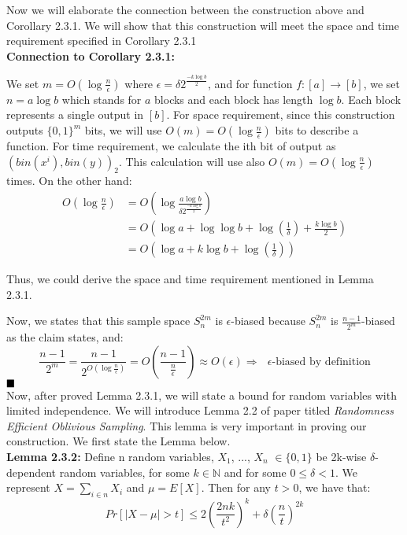 \documentclass[a4paper, english]{paper}
\begin{document}
 Now we will elaborate the connection between the construction above and Corollary 2.3.1. We will show that this construction will meet the space and time requirement specified in Corollary 2.3.1\\

\noindent\textbf{Connection to Corollary 2.3.1:}\par
We set $m=O(\log \frac n \epsilon)$ where $\epsilon = \delta 2^{\frac{-k\log b}2}$, and for function $f: [a]\rightarrow[b]$, we set $n=a\log b$ which stands for $a$ blocks and each block has length $\log b$. Each block represents a single output in $[b]$. For space requirement, since this construction outputs $\{0,1\}^m$ bits, we will use $O(m)=O(\log \frac n \epsilon)$ bits to describe a function. For time requirement, we calculate the ith bit of output as $(bin(x^i),bin(y))_2$. This calculation will use also $O(m)=O(\log \frac n \epsilon)$ times. On the other hand:
\begin{align*}
O(\log \frac n \epsilon) &= O(\log \frac{a\log b}{\delta 2^{\frac{-k\log b}2}})\\
&= O(\log a + \log\log b+\log(\frac1\delta)+\frac{k \log b}2)\\
&= O(\log a + k \log b+ \log(\frac1\delta))
\end{align*}\par
Thus, we could derive the space and time requirement mentioned in Lemma 2.3.1.\par
Now, we states that this sample space $S^{2m}_n$ is $\epsilon$-biased because $S^{2m}_n$ is $\frac{n-1}{2^m}$-biased as the claim states, and:
$$\frac{n-1}{2^m} = \frac{n-1}{2^{O(\log\frac n \epsilon)}} = O(\frac{n-1}{\frac n \epsilon}) \approx O(\epsilon)\Rightarrow \text{ $\epsilon$-biased by definition}$$
$\hfill\blacksquare$ \\

\vspace{0.5cm}
 Now, after proved Lemma 2.3.1, we will state a bound for random variables with limited independence. We will introduce Lemma 2.2 of paper titled \textit{Randomness Efficient Oblivious Sampling}. This lemma is very important in proving our construction. We first state the Lemma below.\\

\noindent\textbf{Lemma 2.3.2:} Define n random variables, $X_1$, ..., $X_n$ $\in \{0, 1\}$ be 2k-wise $\delta$-dependent random variables, for some $k \in \mathbb{N}$ and for some $0 \le \delta < 1$. We represent $X = \sum_{i \in n} X_i$  and $\mu = E[X]$. Then for any $t > 0$, we have that:
	$$ Pr[|X - \mu| > t] \le 2(\frac{2nk}{t^2})^k + \delta(\frac{n}{t})^{2k} $$
	
\end{document}
